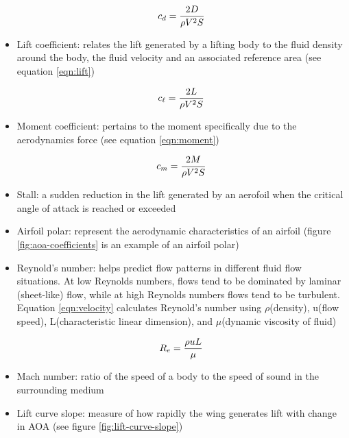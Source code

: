 \documentclass{journal}
\begin{document}
\begin{itemize}
		\begin{equation}
			\centering
			\label{eqn:drag}
			c_d = \frac{2D}{\rho{V^2}S}
		\end{equation}
	
		\item Lift coefficient: relates the lift generated by a lifting body to the fluid density around the body, the fluid velocity and an associated reference area (see equation \ref{eqn:lift})
		
		\begin{equation}
			\centering
			\label{eqn:lift}
			c_\ell = \frac{2L}{\rho{V^2}S}
		\end{equation}
	
		\item Moment coefficient: pertains to the moment specifically due to the aerodynamics force (see equation \ref{eqn:moment})
		
		\begin{equation}
			\centering
			\label{eqn:moment}
			c_m = \frac{2M}{\rho{V^2}S}
		\end{equation}
	
		\item Stall: a sudden reduction in the lift generated by an aerofoil when the critical angle of attack is reached or exceeded	
		\item Airfoil polar: represent the aerodynamic characteristics of an airfoil (figure \ref{fig:aoa-coefficients} is an example of an airfoil polar)
		\item Reynold's number: helps predict flow patterns in different fluid flow situations. At low Reynolds numbers, flows tend to be dominated by laminar (sheet-like) flow, while at high Reynolds numbers flows tend to be turbulent. Equation \ref{eqn:velocity} calculates Reynold's number using \(\rho\)(density), u(flow speed), L(characteristic linear dimension), and \(\mu\)(dynamic viscosity of fluid)
		
		\begin{equation}
			\centering
			\label{eqn:velocity}
			R_e = \frac{\rho{uL}}{\mu}
		\end{equation}
		
		\item Mach number: ratio of the speed of a body to the speed of sound in the surrounding medium
		\item Lift curve slope: measure of how rapidly the wing generates lift with change in AOA (see figure \ref{fig:lift-curve-slope})
		

\end{itemize}
\end{document}
